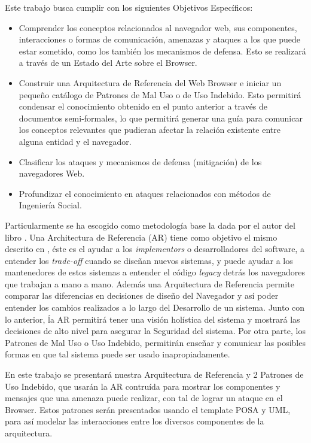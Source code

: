 Este trabajo busca cumplir con los siguientes Objetivos Específicos:

\begin{itemize}
	\item Comprender los conceptos relacionados al navegador web, sus componentes, interacciones o formas de comunicación, amenazas y ataques a los que puede estar sometido, como los también los mecanismos de defensa. Esto se realizará a través de un Estado del Arte sobre el Browser.
	\item Construir una Arquitectura de Referencia del Web Browser e iniciar un pequeño catálogo de Patrones de Mal Uso o de Uso Indebido. Esto permitirá condensar el conocimiento obtenido en el punto anterior a través de documentos semi-formales, lo que permitirá generar una guía para comunicar los conceptos relevantes que pudieran afectar la relación existente entre alguna entidad y el navegador.
	\item Clasificar los ataques y mecanismos de defensa (mitigación) de los navegadores Web. %
	\item Profundizar el conocimiento en ataques relacionados con métodos de Ingeniería Social.
	
\end{itemize} 

Particularmente se ha escogido como metodología base la dada por el autor del libro \cite{fernandez2013security}. Una Architectura de Referencia (AR) tiene como objetivo el mismo descrito en \cite{2005-grosskurth-browser-refarch, preprint-grosskurth-browser-archevol}, éste es el ayudar a los \textit{implementors} o desarrolladores del software, a entender los \textit{trade-off} cuando se diseñan nuevos sistemas, y puede ayudar a los mantenedores de estos sistemas a entender el código \textit{legacy} detrás los navegadores que trabajan a mano a mano. Además una Arquitectura de Referencia permite comparar las diferencias en decisiones de diseño del Navegador y así poder entender los cambios realizados a lo largo del Desarrollo de un sistema. Junto con lo anterior, ĺa AR permitirá tener una visión holística del sistema y mostrará las decisiones de alto nivel para asegurar la Seguridad del sistema. Por otra parte, los Patrones de Mal Uso o Uso Indebido, permitirán enseñar y comunicar las posibles formas en que tal sistema puede ser usado inapropiadamente.

En este trabajo se presentará nuestra Arquitectura de Referencia y 2 Patrones de Uso Indebido, que usarán la AR contruída para mostrar los componentes y mensajes que una amenaza puede realizar, con tal de lograr un ataque en el Browser. Estos patrones serán presentados usando el template POSA \cite{buschman1996system} y UML, para así modelar las interacciones entre los diversos componentes de la arquitectura.

